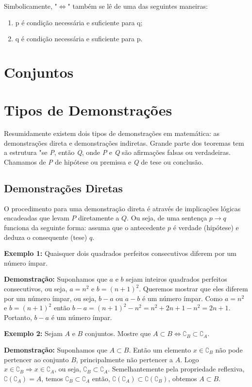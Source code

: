 Simbolicamente, "$\Leftrightarrow$" também se lê de uma das seguintes maneiras:
\begin{enumerate}
	\item p é condição necessária e suficiente para q;
	\item q é condição necessária e suficiente para p.
\end{enumerate}
  
	\section{Conjuntos}
	


  	\section{Tipos de Demonstrações}
  
Resumidamente existem dois tipos de demonstrações em matemática: as demonstrações direta e demonstrações indiretas. Grande parte dos teoremas tem a estrutura "se \textit{P}, então \textit{Q}, onde \textit{P} e \textit{Q} são afirmações falsas ou verdadeiras. Chamamos de \textit{P} de hipótese ou premissa e \textit{Q} de tese ou conclusão.

    \subsection{Demonstrações Diretas}

O procedimento para uma demonstração direta é através de implicações lógicas encadeadas que levam $P$ diretamente a $Q$. Ou seja, de uma sentença $p \to q$ funciona da seguinte forma: assuma que o antecedente $p$ é verdade (hipótese) e deduza o consequente (tese) $q$.

\noindent \textbf{Exemplo 1:} Quaisquer dois quadrados perfeitos consecutivos diferem por um número ímpar.

\noindent \textbf{Demonstração:} Suponhamos que $a$ e $b$ sejam inteiros quadrados perfeitos consecutivos, ou seja, $a = n^2$ e $b = (n+1)^2$. Queremos mostrar que eles diferem por um número ímpar, ou seja, $b-a$ ou $a-b$ é um número ímpar. Como $a = n^2$ e $b = (n+1)^2$ então $b-a = (n+1)^2 - n^2 = n^2+2n+1-n^2 = 2n+1$. Portanto, $b-a$ é um número ímpar.

\noindent \textbf{Exemplo 2:} Sejam $A$ e $B$ conjuntos. Mostre que $A \subset B \Leftrightarrow \complement_B \subset \complement_A$.

\noindent \textbf{Demonstração:} Suponhamos que $A \subset B$. Então um elemento $x \in \complement_B$ não pode pertencer ao conjunto $B$, principalmente não pertencer a $A$. Logo $x \in \complement_B \Rightarrow x \in \complement_A$, ou seja, $\complement_B \subset \complement_A$. Semelhantemente pela propriedade reflexiva, $\complement(\complement_A) = A$, temos $\complement_B \subset \complement_A$ então, $\complement(\complement_A) \subset \complement(\complement_B)$, obtemos $A \subset B$.

